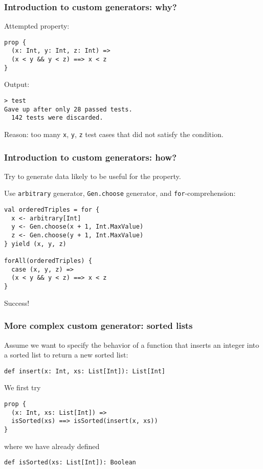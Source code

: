 \documentclass{beamer}
\begin{document}
\begin{frame}[fragile]
  \frametitle{Introduction to custom generators: why?}

  Attempted property:

  \begin{verbatim}
prop {
  (x: Int, y: Int, z: Int) =>
  (x < y && y < z) ==> x < z
}
  \end{verbatim}

  Output:

  \begin{verbatim}
> test
Gave up after only 28 passed tests.
  142 tests were discarded.
  \end{verbatim}

  Reason: too many \texttt{x}, \texttt{y}, \texttt{z} test cases that did not satisfy the condition.
\end{frame}

\begin{frame}[fragile]
  \frametitle{Introduction to custom generators: how?}

  Try to generate data likely to be useful for the property.

  Use \texttt{arbitrary} generator, \texttt{Gen.choose} generator, and \texttt{for}-comprehension:

  \begin{verbatim}
val orderedTriples = for {
  x <- arbitrary[Int]
  y <- Gen.choose(x + 1, Int.MaxValue)
  z <- Gen.choose(y + 1, Int.MaxValue)
} yield (x, y, z)

forAll(orderedTriples) {
  case (x, y, z) =>
  (x < y && y < z) ==> x < z
}
  \end{verbatim}

  Success!
\end{frame}

\begin{frame}[fragile]
  \frametitle{More complex custom generator: sorted lists}

  Assume we want to specify the behavior of a function that inserts an integer into a sorted list to return a new sorted list:
  \begin{verbatim}
def insert(x: Int, xs: List[Int]): List[Int]
  \end{verbatim}
  
  We first try
  \begin{verbatim}
prop {
  (x: Int, xs: List[Int]) =>
  isSorted(xs) ==> isSorted(insert(x, xs))
}
  \end{verbatim}

  where we have already defined
  \begin{verbatim}
def isSorted(xs: List[Int]): Boolean
  \end{verbatim}

\end{frame}
\end{document}
